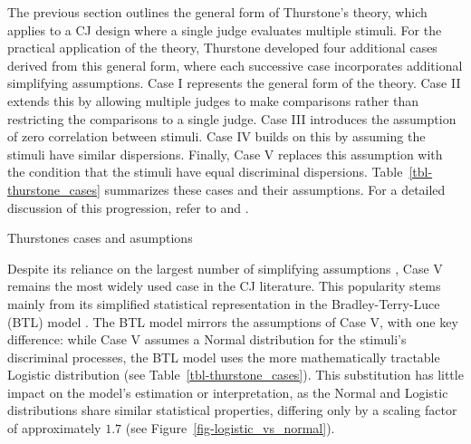 \documentclass[
  authoryear,
  preprint,
  1p]{elsarticle}
\begin{document}
The previous section outlines the general form of Thurstone's theory,
which applies to a CJ design where a single judge evaluates multiple
stimuli. For the practical application of the theory, Thurstone
developed four additional cases derived from this general form, where
each successive case incorporates additional simplifying assumptions.
Case I represents the general form of the theory. Case II extends this
by allowing multiple judges to make comparisons rather than restricting
the comparisons to a single judge. Case III introduces the assumption of
zero correlation between stimuli. Case IV builds on this by assuming the
stimuli have similar dispersions. Finally, Case V replaces this
assumption with the condition that the stimuli have equal discriminal
dispersions. Table~\ref{tbl-thurstone_cases} summarizes these cases and
their assumptions. For a detailed discussion of this progression, refer
to \citet{Thurstone_1927b} and \citet[pp.~248-253]{Bramley_2008}.

\begin{table}

\caption{\label{tbl-thurstone_cases}Thurstones cases and asumptions}


\end{table}%

Despite its reliance on the largest number of simplifying assumptions
\citetext{\citealp[pp.~253]{Bramley_2008}; \citealp[pp.~677]{Kelly_et_al_2022}},
Case V remains the most widely used case in the CJ literature. This
popularity stems mainly from its simplified statistical representation
in the Bradley-Terry-Luce (BTL) model
\citep{Bradley_et_al_1952, Luce_1959}. The BTL model mirrors the
assumptions of Case V, with one key difference: while Case V assumes a
Normal distribution for the stimuli's discriminal processes, the BTL
model uses the more mathematically tractable Logistic distribution
\citep[pp.~254]{Andrich_1978, Bramley_2008} (see
Table~\ref{tbl-thurstone_cases}). This substitution has little impact on
the model's estimation or interpretation, as the Normal and Logistic
distributions share similar statistical properties, differing only by a
scaling factor of approximately \(1.7\)
\citep[pp.~16]{vanderLinden_et_al_2017_I} (see
Figure~\ref{fig-logistic_vs_normal}).
\end{document}
